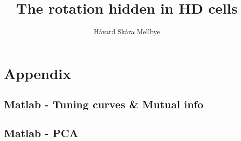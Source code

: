 \documentclass[]{article}
\title{The rotation hidden in HD cells}
\author{Håvard Skåra Mellbye}
\begin{document}
\maketitle







\printbibliography
\section{Appendix}
\subsection{Matlab - Tuning curves \& Mutual info}

\subsection{Matlab - PCA}

\end{document}
